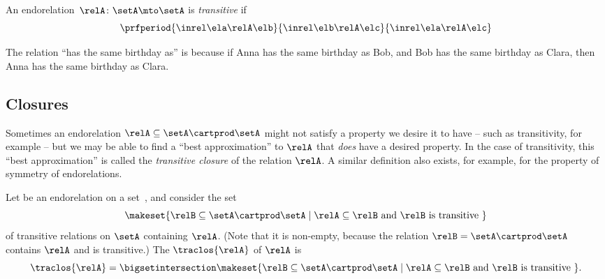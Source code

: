 \begin{ctdefinition}[Transitive]
    \label{def:transitive-relation}
    An endorelation~$\relA\colon \setA\mto \setA$ is \emph{transitive} if
    \begin{equation}\label{eq:transitive}
        \prfperiod{
            \inrel \ela \relA \elb
        }{
            \inrel \elb \relA \elc
        }{
            \inrel \ela \relA \elc
        }
    \end{equation}
\end{ctdefinition}

\begin{example}
    The relation ``has the same birthday as'' is  because if Anna has the same birthday as Bob, and Bob has the same birthday as Clara, then Anna has the same birthday as Clara.
\end{example}

\subsection{Closures}

Sometimes an endorelation $\relA \subseteq \setA \cartprod \setA$ might not satisfy a property we desire it to have -- such as transitivity, for example -- but we may be able to find a ``best approximation'' to $\relA$ that \emph{does} have a desired property.
In the case of transitivity, this ``best approximation'' is called the \emph{transitive closure} of the relation $\relA$.
A similar definition also exists, for example, for the property of symmetry of endorelations.

\begin{ctdefinition}
    \label{def:transitive-closure}
    Let \relA be an endorelation on a set~\setA, and consider the set
    \begin{equation}
        \makeset{ \relB \subseteq \setA \cartprod \setA \mid \relA \subseteq \relB \text{ and } \relB \text{ is transitive } }
    \end{equation}
    of transitive relations on $\setA$ containing $\relA$. (Note that it is non-empty, because the relation $\relB = \setA \cartprod \setA$ contains $\relA$ and is transitive.) The  $\traclos{\relA}$ of $\relA$ is
    \begin{equation}
        \traclos{\relA} = \bigsetintersection \makeset{ \relB \subseteq \setA \cartprod \setA \mid \relA \subseteq \relB \text{ and } \relB \text{ is transitive } }.
    \end{equation}
\end{ctdefinition}

